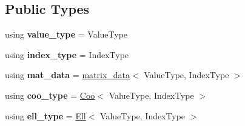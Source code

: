\subsection*{Public Types}
\begin{DoxyCompactItemize}
\item 
\mbox{\label{classgko_1_1matrix_1_1Hybrid_ab7dc8fc8adf3a4911bea8735b61aedcb}} 
using {\bfseries value\+\_\+type} = Value\+Type
\item 
\mbox{\label{classgko_1_1matrix_1_1Hybrid_aa3a33fb6537865ef3b8a3783b80df854}} 
using {\bfseries index\+\_\+type} = Index\+Type
\item 
\mbox{\label{classgko_1_1matrix_1_1Hybrid_a834d0a3d25bede233fef6cfa111c4fad}} 
using {\bfseries mat\+\_\+data} = \hyperlink{structgko_1_1matrix__data}{matrix\+\_\+data}$<$ Value\+Type, Index\+Type $>$
\item 
\mbox{\label{classgko_1_1matrix_1_1Hybrid_a8c65b9003a55d0f55aa39cb36f029548}} 
using {\bfseries coo\+\_\+type} = \hyperlink{classgko_1_1matrix_1_1Coo}{Coo}$<$ Value\+Type, Index\+Type $>$
\item 
\mbox{\label{classgko_1_1matrix_1_1Hybrid_aa1309bf2e1e389e5dcfadb5cf3dfb77f}} 
using {\bfseries ell\+\_\+type} = \hyperlink{classgko_1_1matrix_1_1Ell}{Ell}$<$ Value\+Type, Index\+Type $>$
\end{DoxyCompactItemize}
